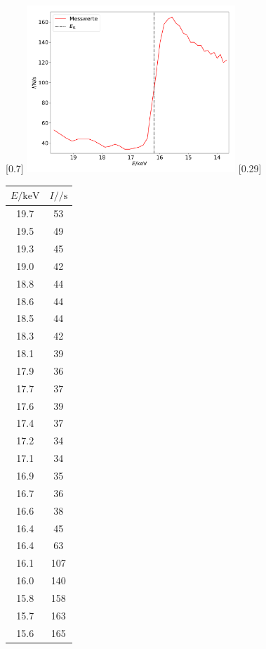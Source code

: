 \begin{figure}
  \centering
  [0.7\textwidth]{
  \includegraphics[width=0.7\textwidth]{strontium.pdf}
  }
  \hfill
  [0.29\textwidth]{
  \begin{tabular}{c c}
    \toprule
    $E / \si{\kilo\electronvolt}$ & $I / \si{\per\second}$ \\
    \midrule
    19.7 & 53 \\
    19.5 & 49 \\
    19.3 & 45 \\
    19.0 & 42 \\
    18.8 & 44 \\
    18.6 & 44 \\
    18.5 & 44 \\
    18.3 & 42 \\
    18.1 & 39 \\
    17.9 & 36 \\
    17.7 & 37 \\
    17.6 & 39 \\
    17.4 & 37 \\
    17.2 & 34 \\
    17.1 & 34 \\
    16.9 & 35 \\
    16.7 & 36 \\
    16.6 & 38 \\
    16.4 & 45 \\
    16.4 & 63 \\
    16.1 & 107 \\
    16.0 & 140 \\
    15.8 & 158 \\
    15.7 & 163 \\
    15.6 & 165 \\

\end{tabular}}
\end{figure}
